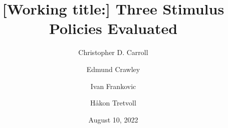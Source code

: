 \documentclass[HAFiscal]{subfiles}
\providecommand{\versn}{pdf} %
\begin{document}
\ifthenelse{\boolean{Web}}{    %
  \renewcommand{\versn}{Web}     %
  \renewcommand{\rootFromOut}{.} %
}{}  %



\title{[Working title:] Three Stimulus Policies Evaluated}

\author{Christopher D. Carroll\authNum \and Edmund Crawley\authNum \and Ivan Frankovic\authNum \and H{\aa}kon Tretvoll\authNum}

\keywords{}


\renewcommand{\forcedate}{August 10, 2022}\date{\forcedate}

\maketitle
\hypertarget{abstract}{}

\hypertarget{links}{}
\end{document}
